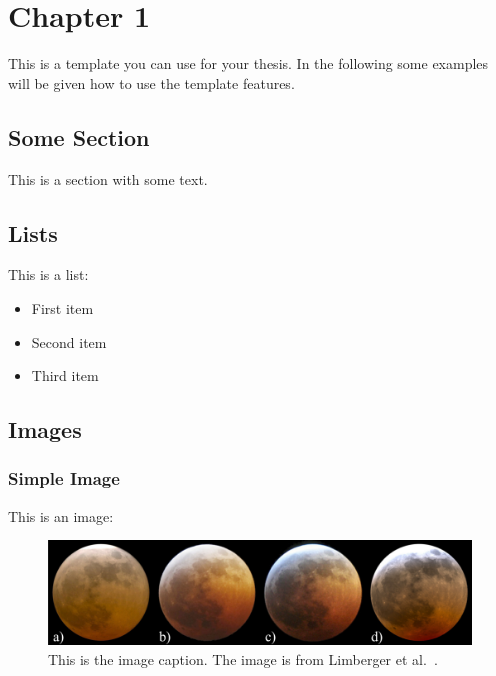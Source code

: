 \chapter{Chapter 1}\label{ch:chapter01}

This is a template you can use for your thesis.
In the following some examples will be given how to use the template features.

\section{Some Section}\label{sec:some-section}
This is a section with some text.

\section{Lists}\label{sec:lists}
This is a list:
\begin{itemize}
    \item First item
    \item Second item
    \item Third item
\end{itemize}

\pagebreak

\section{Images}\label{sec:images}

\subsection{Simple Image}\label{subsec:simple-image}

This is an image:
\begin{figure}[h]
    \centering
    \includegraphics[width=\textwidth]{chapter01/images/Comparison_Yapo_Limberger}
    \caption{This is the image caption. The image is from Limberger et al.~\cite{Limberger2012}.}
    \label{fig:image-example}
\end{figure}


